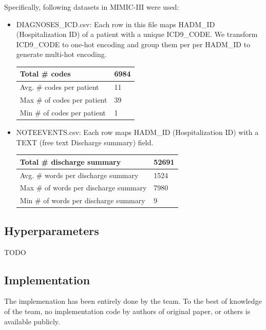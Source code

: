 \documentclass[11pt,a4paper]{article}
\begin{document}
Specifically, following datasets in MIMIC-III were used:

\begin{itemize}
    \item DIAGNOSES\_ICD.csv: Each row in this file maps HADM\_ID (Hospitalization ID) of a patient with a unique ICD9\_CODE. We transform ICD9\_CODE to one-hot encoding and group them per per HADM\_ID to generate multi-hot encoding.
\newline

\begin{small}
\begin{tabular}{ ll }
  \hline
  	Total \# codes & 6984 \\
  \hline
  	Avg. \# codes per patient & 11 \\
  \hline
  	Max \# of codes per patient & 39 \\
  \hline
  	Min \# of codes per patient & 1 \\
  \hline
\end{tabular}
\end{small}

	\item NOTEEVENTS.csv: Each row maps HADM\_ID (Hospitalization ID) with a TEXT (free text Discharge summary) field.
\newline

\begin{small}
\begin{tabular}{ ll }
  \hline
    Total \# discharge summary & 52691 \\
  \hline
    Avg. \# words per discharge summary & 1524 \\ 
  \hline
    Max \# of words per discharge summary & 7980 \\
  \hline
  	Min \# of words per discharge summary & 9 \\
  \hline
\end{tabular}
\end{small}
\end{itemize}


\subsection{Hyperparameters}

TODO

\subsection{Implementation}

The implemenation has been entirely done by the team. To the best of knowledge of the team, no implementation code by authors of original paper, or others is available publicly.
\end{document}
